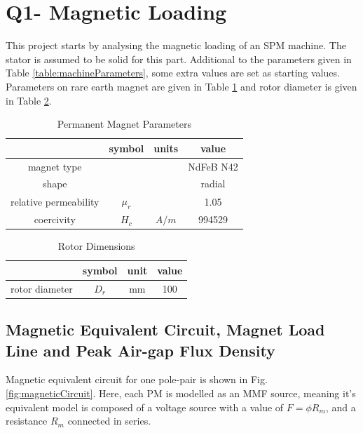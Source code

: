 \documentclass[a4paper, 11pt, titlepage]{article}
\begin{document}
\section{Q1- Magnetic Loading}
\label{sec:Q1}

This project starts by analysing the magnetic loading of an SPM machine. The stator is assumed to be solid for this part. Additional to the parameters given in Table \ref{table:machineParameters}, some extra values are set as starting values. Parameters on rare earth magnet are given in Table \ref{fig:PMParameters} and rotor diameter is given in Table \ref{table:rotorParameter}.





\begin{table}[h]
	\begin{center}
		\begin{tabular}{c|c|c|c}
			 & symbol & units & value \\
			\hline
			magnet type & & & NdFeB N42 \\
			shape & & & radial \\ 
			relative permeability & $\mu_r$ & & 1.05 \\
			coercivity & $H_c$ & $A/m$ & 994529 \\
			\hline
		\end{tabular}
	\end{center}
	\caption{Permanent Magnet Parameters}
	\label{fig:PMParameters}
\end{table}


\begin{table}[h]
	\begin{center}
		\begin{tabular}{c|c|c|c}
			 & symbol & unit & value \\
			\hline
			rotor diameter & $D_r$ & mm & 100 \\
			\hline
		\end{tabular}
	\end{center}
	\caption{Rotor Dimensions}
	\label{table:rotorParameter}
\end{table}




\subsection{Magnetic Equivalent Circuit, Magnet Load Line and Peak Air-gap Flux Density}
\label{sec:peakAir-gapFluxDensity}

Magnetic equivalent circuit for one pole-pair is shown in Fig. \ref{fig:magneticCircuit}. Here, each PM is modelled as an MMF source, meaning it's equivalent model is composed of a voltage source with a value of $F=\phi R_m$, and a resistance $R_m$ connected in series.
\end{document}
